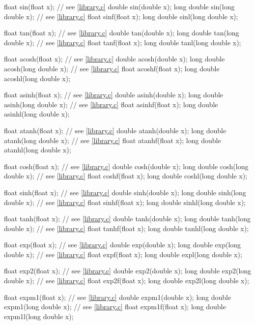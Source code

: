 \begin{codeblock}
{  float sin(float x);                   // see \ref{library.c}
  double sin(double x);
  long double sin(long double x);       // see \ref{library.c}
  float sinf(float x);
  long double sinl(long double x);

  float tan(float x);                   // see \ref{library.c}
  double tan(double x);
  long double tan(long double x);       // see \ref{library.c}
  float tanf(float x);
  long double tanl(long double x);

  float acosh(float x);                 // see \ref{library.c}
  double acosh(double x);
  long double acosh(long double x);     // see \ref{library.c}
  float acoshf(float x);
  long double acoshl(long double x);

  float asinh(float x);                 // see \ref{library.c}
  double asinh(double x);
  long double asinh(long double x);     // see \ref{library.c}
  float asinhf(float x);
  long double asinhl(long double x);

  float atanh(float x);                 // see \ref{library.c}
  double atanh(double x);
  long double atanh(long double x);     // see \ref{library.c}
  float atanhf(float x);
  long double atanhl(long double x);

  float cosh(float x);                  // see \ref{library.c}
  double cosh(double x);
  long double cosh(long double x);      // see \ref{library.c}
  float coshf(float x);
  long double coshl(long double x);

  float sinh(float x);                  // see \ref{library.c}
  double sinh(double x);
  long double sinh(long double x);      // see \ref{library.c}
  float sinhf(float x);
  long double sinhl(long double x);

  float tanh(float x);                  // see \ref{library.c}
  double tanh(double x);
  long double tanh(long double x);      // see \ref{library.c}
  float tanhf(float x);
  long double tanhl(long double x);

  float exp(float x);                   // see \ref{library.c}
  double exp(double x);
  long double exp(long double x);       // see \ref{library.c}
  float expf(float x);
  long double expl(long double x);

  float exp2(float x);                  // see \ref{library.c}
  double exp2(double x);
  long double exp2(long double x);      // see \ref{library.c}
  float exp2f(float x);
  long double exp2l(long double x);

  float expm1(float x);                 // see \ref{library.c}
  double expm1(double x);
  long double expm1(long double x);     // see \ref{library.c}
  float expm1f(float x);
  long double expm1l(long double x);

}
\end{codeblock}
